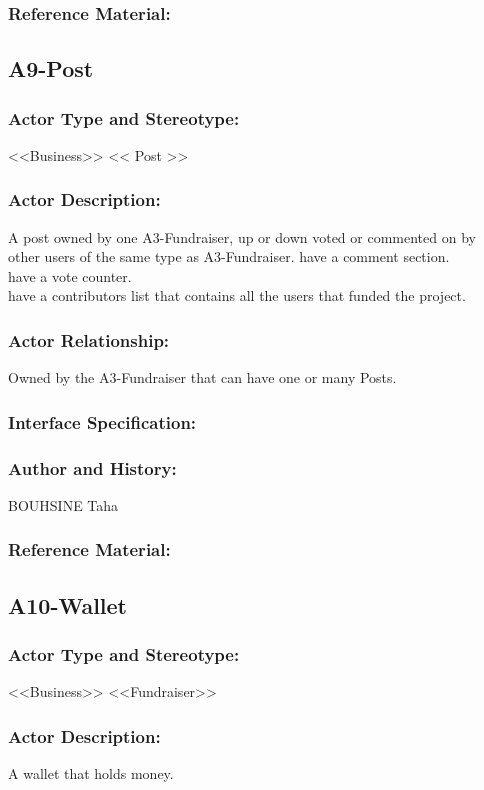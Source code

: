 \documentclass[11pt, openany]{report}
\begin{document}
\subsubsection{Reference Material:}

\clearpage
\subsection{A9-Post}
\label{A9}
\subsubsection{Actor Type and Stereotype:}
<<Business>> << Post >>
\subsubsection{Actor Description:}
A post owned by one A3-Fundraiser, up or down voted or commented on by other users of the same type as A3-Fundraiser.
have a comment section.\\
have a vote counter.\\
have a contributors list that contains all the users that funded the project.\\
\subsubsection{Actor Relationship:}
Owned by the A3-Fundraiser that can have one or many Posts.
\subsubsection{Interface Specification:}
\subsubsection{Author and History:}
BOUHSINE Taha
\subsubsection{Reference Material:}

\clearpage
\subsection{A10-Wallet}
\label{A10}
\subsubsection{Actor Type and Stereotype:}
<<Business>> <<Fundraiser>>
\subsubsection{Actor Description:}
A wallet that holds money.
\end{document}
